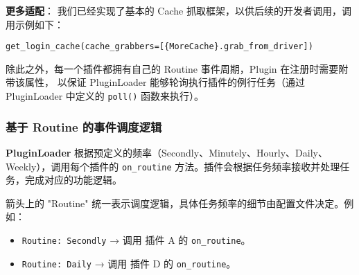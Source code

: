 \begin{rmr}
    \textbf{更多适配}：
    我们已经实现了基本的 Cache 抓取框架，以供后续的开发者调用，调用示例如下：

    \texttt{get\_login\_cache(cache\_grabbers=[\{MoreCache\}.grab\_from\_driver])}
\end{rmr}

除此之外，每一个插件都拥有自己的 Routine 事件周期，Plugin 在注册时需要附带该属性，
以保证 PluginLoader 能够轮询执行插件的例行任务（通过 PluginLoader 中定义的 \texttt{poll()} 函数来执行）。

\subsubsection{基于 Routine 的事件调度逻辑}

\begin{note}
    \noindent \textbf{PluginLoader} 根据预定义的频率（Secondly、Minutely、Hourly、Daily、Weekly），调用每个插件的 \texttt{on\_routine} 方法。插件会根据任务频率接收并处理任务，完成对应的功能逻辑。

    \vspace{0.3cm}

    \noindent 箭头上的 "Routine" 统一表示调度逻辑，具体任务频率的细节由配置文件决定。例如：
    \begin{itemize}
        \item \texttt{Routine: Secondly} → 调用 插件 A 的 \texttt{on\_routine}。
        \item \texttt{Routine: Daily} → 调用 插件 D 的 \texttt{on\_routine}。
    \end{itemize}
\end{note}

\vspace{0.27cm}

